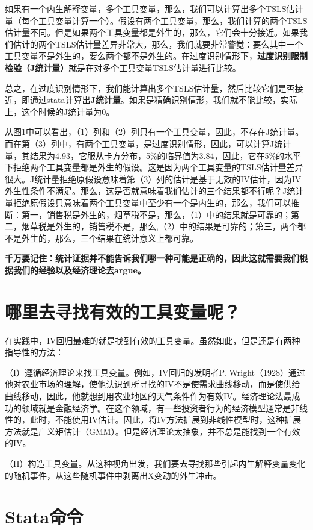 \documentclass[cn,12pt,math=newtx,citestyle=gb7714-2015,bibstyle=gb7714-2015]{elegantbook}
\begin{document}
	如果有一个内生解释变量，多个工具变量，那么，我们可以计算出多个TSLS估计量（每个工具变量计算一个）。假设有两个工具变量，那么，我们计算的两个TSLS估计量不同。但是如果两个工具变量都是外生的，那么，它们会十分接近。如果我们估计的两个TSLS估计量差异非常大，那么，我们就要非常警觉：要么其中一个工具变量不是外生的，要么两个都不是外生的。在过度识别情形下，\textbf{过度识别限制检验（J统计量）}就是在对多个工具变量TSLS估计量进行比较。
	
	总之，在过度识别情形下，我们能计算出多个TSLS估计量，然后比较它们是否接近，即通过stata计算出\textbf{J统计量}。如果是精确识别情形，我们就不能比较，实际上，这个时候的J统计量为0。
	
	从图1中可以看出，（1）列和（2）列只有一个工具变量，因此，不存在J统计量。而在第（3）列中，有两个工具变量，是过度识别情形，因此，可以计算J统计量，其结果为4.93，它服从卡方分布，5\%的临界值为3.84，因此，它在5\%的水平下拒绝两个工具变量都是外生的假设。这是因为两个工具变量的TSLS估计量差异很大。J统计量拒绝原假设意味着第（3）列的估计是基于无效的IV估计，因为IV外生性条件不满足。那么，这是否就意味着我们估计的三个结果都不行呢？J统计量拒绝原假设只意味着两个工具变量中至少有一个是内生的，那么，我们可以推断：第一，销售税是外生的，烟草税不是，那么，（1）中的结果就是可靠的；第二，烟草税是外生的，销售税不是，那么,（2）中的结果是可靠的；第三，两个都不是外生的，那么，三个结果在统计意义上都可靠。
	
	\textbf{千万要记住：统计证据并不能告诉我们哪一种可能是正确的，因此这就需要我们根据我们的经验以及经济理论去argue。}
	
	\section{哪里去寻找有效的工具变量呢？}
	
	在实践中，IV回归最难的就是找到有效的工具变量。虽然如此，但是还是有两种指导性的方法：
	
	（I）遵循经济理论来找工具变量。例如，IV回归的发明者P. Wright（1928）通过他对农业市场的理解，使他认识到所寻找的IV不是使需求曲线移动，而是使供给曲线移动，因此，他就想到用农业地区的天气条件作为有效IV。经济理论法最成功的领域就是金融经济学。在这个领域，有一些投资者行为的经济模型通常是非线性的，此时，不能使用IV估计。因此，将IV方法扩展到非线性模型时，这种扩展方法就是广义矩估计（GMM）。但是经济理论太抽象，并不总是能找到一个有效的IV。
	
	（II）构造工具变量。从这种视角出发，我们要去寻找那些引起内生解释变量变化的随机事件，从这些随机事件中剥离出X变动的外生冲击。
	
	
	\section{Stata命令}
	
\end{document}
